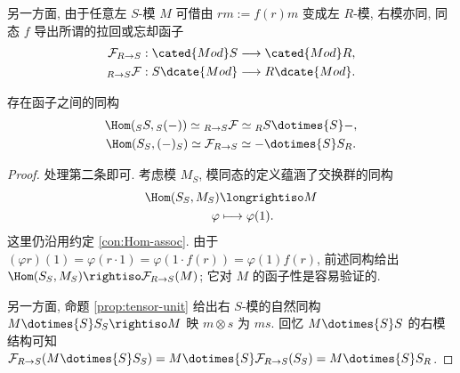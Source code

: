 另一方面, 由于任意左 $S$-模 $M$ 可借由 $rm := f(r)m$ 变成左 $R$-模, 右模亦同, 同态 $f$ 导出所谓的拉回或忘却函子  
\begin{align*}
	\mathcal{F}_{R \to S}: \cated{Mod}S & \longrightarrow \cated{Mod}R, \\
	{}_{R \to S} \mathcal{F}: S\dcate{Mod} & \longrightarrow R\dcate{Mod}.
\end{align*}

\begin{lemma}\label{prop:forgetful-as-tensor-Hom}
	存在函子之间的同构
	\begin{gather*}
		\Hom({}_S S, {}_S (-)) \simeq {}_{R \to S} \mathcal{F} \simeq {}_R S \dotimes{S} - , \\
		\Hom(S_S, (-)_S) \simeq \mathcal{F}_{R \to S} \simeq - \dotimes{S} S_R.
	\end{gather*}
\end{lemma}
\begin{proof}
	处理第二条即可. 考虑模 $M_S$, 模同态的定义蕴涵了交换群的同构
	\begin{align*}
		\Hom(S_S, M_S) & \longrightiso M \\
		\varphi & \longmapsto \varphi(1).
	\end{align*}
	这里仍沿用约定 \ref{con:Hom-assoc}. 由于 $(\varphi r)(1) = \varphi(r \cdot 1) = \varphi(1 \cdot f(r)) = \varphi(1) f(r)$, 前述同构给出 $\Hom(S_S, M_S) \rightiso \mathcal{F}_{R \to S}(M)$; 它对 $M$ 的函子性是容易验证的.

	另一方面, 命题 \ref{prop:tensor-unit} 给出右 $S$-模的自然同构 $M \dotimes{S} S_S \rightiso M$ 映 $m \otimes s$ 为 $ms$. 回忆 $M \dotimes{S} S$ 的右模结构可知 $\mathcal{F}_{R \to S} (M \dotimes{S} S_S) = M \dotimes{S} \mathcal{F}_{R \to S}(S_S) = M \dotimes{S} S_R$.
\end{proof}

